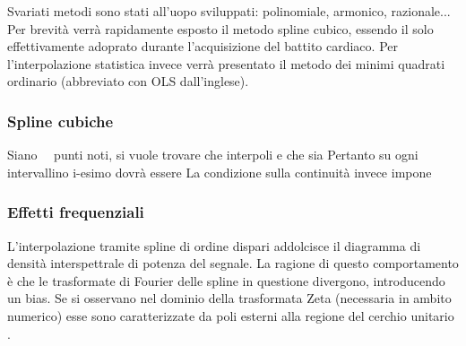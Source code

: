 Svariati metodi sono stati all'uopo sviluppati: polinomiale, armonico, razionale... Per brevità verrà rapidamente esposto il metodo spline cubico, essendo il solo effettivamente adoprato durante l'acquisizione del battito cardiaco. Per l'interpolazione statistica invece verrà presentato il metodo dei minimi quadrati ordinario (abbreviato con OLS dall'inglese).
		\subsubsection{Spline cubiche}
Siano   ~~punti noti, si vuole trovare  che interpoli e che sia 
Pertanto su ogni intervallino i-esimo dovrà essere  La condizione sulla continuità invece impone 
		\subsubsection{Effetti frequenziali}
L'interpolazione tramite spline di ordine dispari addolcisce il diagramma di densità interspettrale di potenza del segnale.
La ragione di questo comportamento è che le trasformate di Fourier delle spline in questione divergono, introducendo un bias. Se si osservano nel dominio della trasformata Zeta (necessaria in ambito numerico) esse sono caratterizzate da poli esterni alla regione del cerchio unitario \cite{IEEE:SPLINE}.
